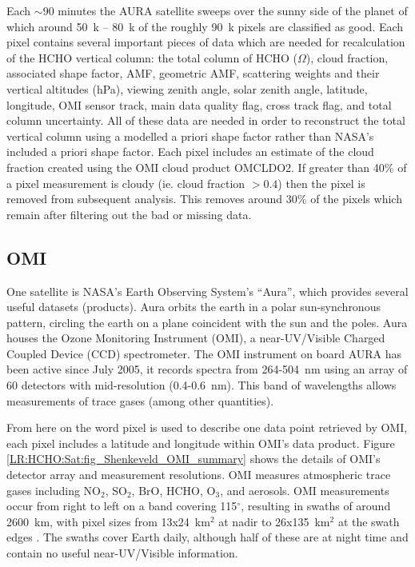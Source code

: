   Each $\sim90$ minutes the AURA satellite sweeps over the sunny side of the planet of which around 50~k -- 80~k of the roughly 90~k pixels are classified as good.
  Each pixel contains several important pieces of data which are needed for recalculation of the HCHO vertical column: the total column of HCHO ($\Omega$\moleccm), cloud fraction, associated shape factor, AMF, geometric AMF, scattering weights and their vertical altitudes (hPa), viewing zenith angle, solar zenith angle, latitude, longitude, OMI sensor track, main data quality flag, cross track flag, and total column uncertainty.
  All of these data are needed in order to reconstruct the total vertical column using a modelled a priori shape factor rather than NASA's included a priori shape factor.
  Each pixel includes an estimate of the cloud fraction created using the OMI cloud product OMCLDO2.
  If greater than 40\% of a pixel measurement is cloudy (ie. cloud fraction $>0.4$) then the pixel is removed from subsequent analysis.
  This removes around 30\% of the pixels which remain after filtering out the bad or missing data.
  
  \subsection{OMI}

    One satellite is NASA's Earth Observing System's ``Aura'', which provides several useful datasets (products).
    Aura orbits the earth in a polar sun-synchronous pattern, circling the earth on a plane coincident with the sun and the poles.
    Aura houses the Ozone Monitoring Instrument (OMI), a near-UV/Visible Charged Coupled Device (CCD) spectrometer.
    The OMI instrument on board AURA has been active since July 2005, it records spectra from 264-504~nm using an array of 60 detectors with mid-resolution (0.4-0.6~nm).
    This band of wavelengths allows measurements of trace gases (among other quantities).
    
    
    From here on the word pixel is used to describe one data point retrieved by OMI, each pixel includes a latitude and longitude within OMI's data product.
    Figure \ref{LR:HCHO:Sat:fig_Shenkeveld_OMI_summary} shows the details of OMI's detector array and measurement resolutions.
    OMI measures atmospheric trace gases including NO$_2$, SO$_2$, BrO, HCHO, O$_3$, and aerosols.
    OMI measurements occur from right to left on a band covering 115$^{\circ}$, resulting in swaths of around 2600~km, with pixel sizes from 13x24~km$^2$ at nadir to 26x135~km$^2$ at the swath edges \parencite{Abad2015}.
    The swaths cover Earth daily, although half of these are at night time and contain no useful near-UV/Visible information.
    
